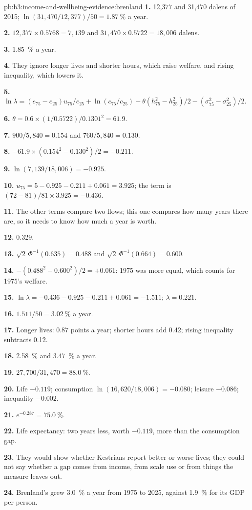 \begin{solution}{pb:b3:income-and-wellbeing-evidence:brenland}
\textbf{1.} 12{,}377 and 31{,}470 dalens of 2015; $\ln(31{,}470/12{,}377)/50 = 1.87~\%$ a year.

\textbf{2.} $12{,}377 \times 0.5768 = 7{,}139$ and $31{,}470 \times 0.5722 = 18{,}006$ dalens.

\textbf{3.} 1.85~\% a year.

\textbf{4.} They ignore longer lives and shorter hours, which raise welfare, and
rising inequality, which lowers it.

\textbf{5.} $\ln\lambda = (e_{75} - e_{25})u_{75}/e_{25} + \ln(c_{75}/c_{25}) - \theta(h_{75}^2 - h_{25}^2)/2 - (\sigma_{75}^2 - \sigma_{25}^2)/2$.

\textbf{6.} $\theta = 0.6 \times (1/0.5722)/0.1301^2 = 61.9$.

\textbf{7.} $900/5{,}840 = 0.154$ and $760/5{,}840 = 0.130$.

\textbf{8.} $-61.9 \times (0.154^2 - 0.130^2)/2 = -0.211$.

\textbf{9.} $\ln(7{,}139/18{,}006) = -0.925$.

\textbf{10.} $u_{75} = 5 - 0.925 - 0.211 + 0.061 = 3.925$; the term is $(72 - 81)/81 \times 3.925 = -0.436$.

\textbf{11.} The other terms compare two flows; this one compares how many years
there are, so it needs to know how much a year is worth.

\textbf{12.} 0.329.

\textbf{13.} $\sqrt2\,\Phi^{-1}(0.635) = 0.488$ and $\sqrt2\,\Phi^{-1}(0.664) = 0.600$.

\textbf{14.} $-(0.488^2 - 0.600^2)/2 = +0.061$: 1975 was more equal, which counts for 1975's welfare.

\textbf{15.} $\ln\lambda = -0.436 - 0.925 - 0.211 + 0.061 = -1.511$; $\lambda = 0.221$.

\textbf{16.} $1.511/50 = 3.02~\%$ a year.

\textbf{17.} Longer lives: 0.87 points a year; shorter hours add 0.42; rising inequality subtracts 0.12.

\textbf{18.} 2.58~\% and 3.47~\% a year.

\textbf{19.} $27{,}700/31{,}470 = 88.0~\%$.

\textbf{20.} Life $-0.119$; consumption $\ln(16{,}620/18{,}006) = -0.080$; leisure $-0.086$; inequality $-0.002$.

\textbf{21.} $e^{-0.287} = 75.0~\%$.

\textbf{22.} Life expectancy: two years less, worth $-0.119$, more than the consumption gap.

\textbf{23.} They would show whether Kestrians report better or worse lives; they
could not say whether a gap comes from income, from scale use or from things the
measure leaves out.

\textbf{24.} Brenland's  grew 3.0~\% a year from 1975 to 2025, against 1.9~\% for its GDP per person.
\end{solution}
